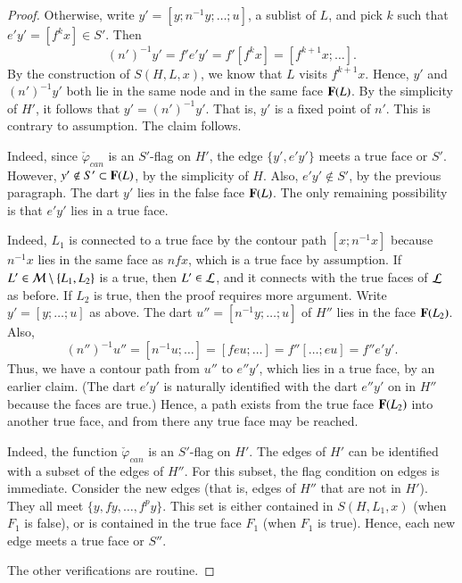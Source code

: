 \begin{proof}
Otherwise, write $y' = [y;n^{-1}y;\ldots;u]$, a sublist of $L$, and
pick $k$ such that $e'y' = [f^k x]\in S'$.  Then
\[ 
(n')^{-1} y' = f'e'y' = f'[f^k x] = [f^{k+1}x;\ldots].
\] 
By the construction of $S(H,L,x)$, we know that $L$ visits $f^{k+1}x$.
Hence, $y'$ and $(n')^{-1}y'$ both lie in the same node and in the same
face ${\mathbf F}(L)$.  By the simplicity of $H'$, it follows that $y' =
(n')^{-1} y'$.  That is, $y'$ is a fixed point of $n'$.  This is contrary to
assumption. The claim follows.


  Indeed, since
$\check\varphi_{can}$ is an $S'$-flag on $H'$, the edge $\{y',e'y'\}$
meets a true face or $S'$.  However, $y'\not\in S'\subset {\mathbf F}(L)$, by
the simplicity of $H$.  Also, $e'y'\not\in S'$, by the previous
paragraph.  The dart $y'$ lies in the false face ${\mathbf F}(L)$.  The only
remaining possibility is that $e'y'$ lies in a true face.



   Indeed,
$L_1$ is connected to a true face by the contour path $[x;n^{-1} x]$
because $n^{-1} x$ lies in the same face as $n f x$, which is a true
face by assumption.  If $L'\in{\cal M}\setminus\{L_1,L_2\}$ is a true,
then $L'\in {\cal L}$, and it connects with the true faces of ${\cal
  L}$ as before.  If $L_2$ is true, then the proof requires more
argument.  Write $y'=[y;\ldots;u]$ as above.  The dart
$u''=[n^{-1}y;\ldots;u]$ of $H''$ lies in the face ${\mathbf F}(L_2)$.  Also,
\[ 
(n'')^{-1} u''= [n^{-1} u;\ldots] = [f e u;\ldots] = f'' [\ldots; e u]
  = f'' e' y'.
\] 
Thus, we have a contour path from $u''$ to $e'' y'$, which lies in a
true face, by an earlier claim.  (The dart $e'y'$ is naturally
identified with the dart $e'' y'$ on in $H''$ because the faces are
true.)  Hence, a path exists from the true face ${\mathbf F}(L_2)$ into another
true face, and from there any true face may be reached.

   Indeed, the
function $\check\varphi_{can}$ is an $S'$-flag on $H'$.  The edges of
$H'$ can be identified with a subset of the edges of $H''$.  For this
subset, the flag condition on edges is immediate.  Consider the new
edges (that is, edges of $H''$ that are not in $H'$).  They all meet
$\{y,f y,\ldots,f^p y\}$.  This set is either contained in
$S(H,L_1,x)$ (when $F_1$ is false), or is contained in the true face
$F_1$ (when $F_1$ is true).  Hence, each new edge meets a true face or
$S''$.


The other verifications are routine.
\end{proof}


